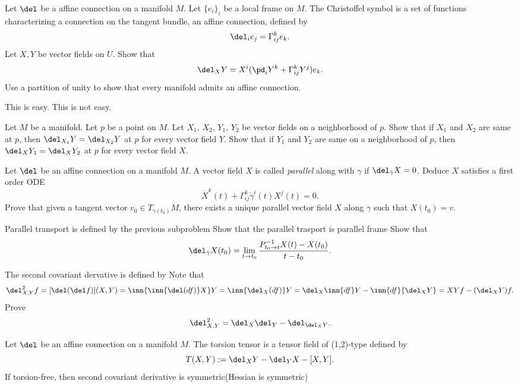 \documentclass[11pt]{article}
\begin{document}
\begin{prb}
Let $\del$ be a affine connection on a manifold $M$.
Let $\{e_i\}_i$ be a local frame on $M$.
The Christoffel symbol is a set of functions characterizing a connection on the tangent bundle, an affine connection, defined by \[\del_ie_j=\Gamma_{ij}^ke_k.\]
Let $X,Y$ be vector fields on $U$.
\q Show that \[\del_XY=X^i(\pd_iY^k+\Gamma_{ij}^kY^j)e_k.\]
\q Use a partition of unity to show that every manifold admits an affine connection.
\end{prb}
\begin{sol}
\q This is easy.
\q This is not easy.
\end{sol}

\begin{prb}[Dependnecy]
Let $M$ be a manifold.
Let $p$ be a point on $M$.
Let $X_1,\,X_2,\,Y_1,\,Y_2$ be vector fields on a neighborhood of $p$.
\q Show that if $X_1$ and $X_2$ are same at $p$, then $\del_{X_1}Y=\del_{X_2}Y$ at $p$ for every vector field $Y$.
\q Show that if $Y_1$ and $Y_2$ are same on a neighborhood of $p$, then $\del_XY_1=\del_XY_2$ at $p$ for every vector field $X$.
\end{prb}

\begin{prb}
Let $\del$ be an affine connection on a manifold $M$.
A vector field $X$ is called \emph{parallel} along with $\gamma$ if $\del_{\dot\gamma}X=0$.
\q Deduce $X$ satisfies a first order ODE \[\dot X^k(t)+\Gamma_{ij}^k\dot\gamma^i(t)X^j(t)=0.\]
\q Prove that given a tangent vector $v_0\in T_{\gamma(t_0)}M$, there exists a unique parallel vector field $X$ along $\gamma$ such that $X(t_0)=v$.
\end{prb}
\begin{prb}
Parallel transport is defined by the previous subproblem
\q Show that the parallel trasport is
\q parallel frame
\q Show that \[\del_{\dot\gamma}X(t_0)=\lim_{t\to t_0}\frac{P_{t_0\to t}^{-1}X(t)-X(t_0)}{t-t_0}.\]
\end{prb}


\begin{prb}
The second covariant dervative is defined by
\q Note that \[\del_{X,Y}^2f=[\del(\del f)](X,Y)=\inn{\inn{\del(df)}X}Y=\inn{\del_X(df)}Y=\del_X\inn{df}Y-\inn{df}{\del_XY}=XYf-(\del_XY)f.\]
\q Prove \[\del_{X,Y}^2=\del_X\del_Y-\del_{\del_XY}.\]
\end{prb}


\begin{prb}
Let $\del$ be an affine connection on a manifold $M$.
The torsion tensor is a tensor field of (1,2)-type defined by
\[T(X,Y):=\del_XY-\del_YX-[X,Y].\]
\q If torsion-free, then second covariant derivative is symmetric(Hessian is symmetric)
\end{prb}
\end{document}
